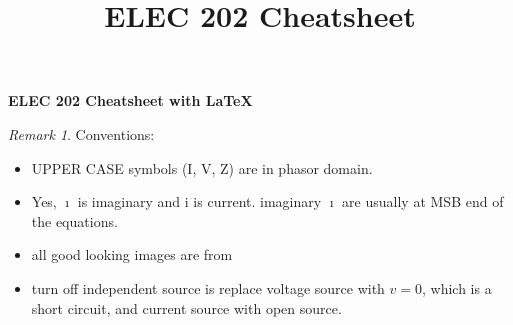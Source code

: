 \documentclass[10pt,landscape]{article}
\title{ELEC 202 Cheatsheet}
\theoremstyle{definition}
\theoremstyle{remark}
\newtheorem*{remark}{Remark}
\begin{document}
\raggedright
\footnotesize

\begin{center}
     \Large{\textbf{ ELEC 202 Cheatsheet with \LaTeX}} \\
\end{center}

\begin{multicols}{3}
\setlength{\premulticols}{1pt}
\setlength{\postmulticols}{1pt}
\setlength{\multicolsep}{1pt}
\setlength{\columnsep}{2pt}




\begin{remark}
Conventions: \\
\begin{itemize}[noitemsep,nolistsep]
    \item UPPER CASE symbols (I, V, Z) are in phasor domain. 
    \item Yes, $\imath$ is imaginary and i is current. imaginary $\imath$ are usually at MSB end of the equations. 
    \item all good looking images are from \cite{Alexander:2006:FEC:1207036}
    \item turn off independent source is replace voltage source with $v = 0$, which is a short circuit, and current source with open source. 
\end{itemize}
\end{remark}





\end{multicols}
\end{document}
